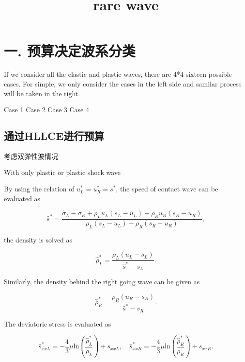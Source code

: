 \documentclass[11pt]{article}
\title{rare wave}
\begin{document}
    
    
    \maketitle
    
    

    
    \section{一.
预算决定波系分类}\label{ux4e00.-ux9884ux7b97ux51b3ux5b9aux6ce2ux7cfbux5206ux7c7b}

If we consider all the elastic and plastic waves, there are 4*4 sixteen
possible cases. For simple, we only consider the cases in the left side
and samilar process will be taken in the right.

Case 1 Case 2 Case 3 Case 4

    \subsection{通过HLLCE进行预算}\label{ux901aux8fc7hllceux8fdbux884cux9884ux7b97}

考虑双弹性波情况

With only plastic or plastic shock wave

    By using the relation of \(u_L^* =u_R^* = s^*\), the speed of contact
wave can be evaluated as

\begin{equation}
 \hat{s}^* = \frac{\sigma_L-\sigma_R+\rho_L u_L(s_L-u_L)-\rho_R u_R(s_R-u_R)}{\rho_L(s_L-u_L)-\rho_R(s_R-u_R)},
\end{equation}

the density is solved as

\begin{equation}\label{eq:rhoLs}
  \hat{\rho}_L^* = \frac{\rho_L(u_L-s_L)}{\hat{s}^*-s_L}.
\end{equation}

Similarly, the density behind the right going wave can be given as

\begin{equation}
  \hat{\rho}_R^* = \frac{\rho_R(u_R-s_R)}{\hat{s}^*-s_R}.
\end{equation}

    The deviatoric stress is evaluated as

\begin{equation}  \label{sxx1}
  \hat{s}_{xxL}^*=-\frac{4}{3}\mu\text{ln}(\frac{\hat{\rho}_L^*}{\rho_L})+s_{xxL}, \quad   \hat{s}_{xxR}^*=-\frac{4}{3}\mu\text{ln}(\frac{\hat{\rho}_R^*}{\rho_R})+s_{xxR}.
\end{equation}
\end{document}

